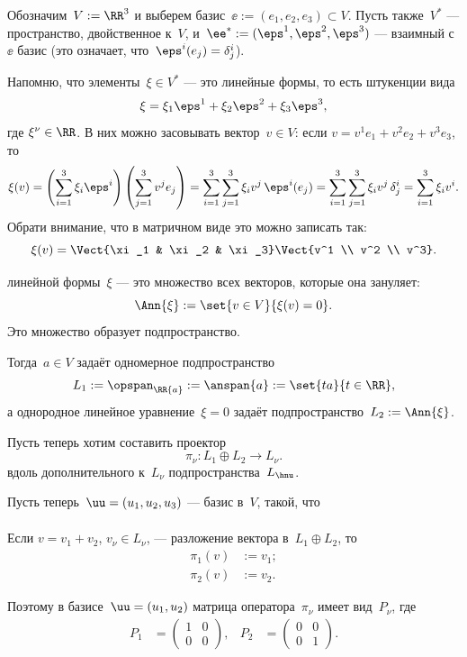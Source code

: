 \begin{proofm}
	Обозначим~$V := \RR^3$ и выберем базис~$\ee := (e_1, e_2, e_3) \subset V$. Пусть также~$V^*$ --- пространство, двойственное к~$V$, и~$\ee^* := (\eps^1, \eps^2, \eps^3)$ --- взаимный с~$\ee$ базис (это означает, что~$\eps^i(e_j) = \delta^i_j$).

	Напомню, что элементы~$\xi \in V^*$ --- это линейные формы, то есть штукенции вида
	\[
		\xi = \xi_1 \eps^1 + \xi_2 \eps^2 + \xi_3 \eps^3
		,
	\]
	где $\xi^\nu \in \RR$. В них можно засовывать вектор~$v \in V$: если $v = v^1 e_1 + v^2 e_2 + v^3 e_3$, то
	\[
		\xi(v) =
		\left( 
			\sum_{i = 1}^3
				\xi_i \eps^i
		\right)
		\left( 
			\sum_{j = 1}^3
				v^j e_j
		\right)
		=
		\sum_{i = 1}^3
		\sum_{j = 1}^3
			\xi_i v^j\,\eps^i(e_j)
		=
		\sum_{i = 1}^3
		\sum_{j = 1}^3
			\xi_i v^j\,\delta^i_j
		=
		\sum_{i = 1}^3
			\xi_i v^i
		.
	\]
	Обрати внимание, что в матричном виде это можно записать так:
	\[
		\xi(v) =
		\Vect{\xi_1 & \xi_2 & \xi_3}
		\Vect{v^1 \\ v^2 \\ v^3}
		.
	\]

	\begin{definition}
		 линейной формы~$\xi$ --- это множество всех векторов, которые она зануляет:
		\[
			\Ann{\xi} :=
			\set{v \in V}{\xi(v) = 0}
			.
		\]
		Это множество образует подпространство.
	\end{definition}

	Тогда~$a \in V$ задаёт одномерное подпространство
	\[
		L_1 :=
		\opspan_\RR{a} :=
		\anspan{a} :=
		\set{ta}{t \in \RR},
	\]
	а однородное линейное уравнение~$\xi = 0$ задаёт подпространство~$L_2 := \Ann{\xi}$.

	Пусть теперь хотим составить проектор
	\[
		\pi_\nu \colon L_1 \oplus L_2 \to L_\nu
		.
	\]
	вдоль дополнительного к~$L_\nu$ подпространства~$L_{\hnu}$.
	
	Пусть теперь~$\uu = (u_1, u_2, u_3)$ --- базис в~$V$, такой, что
	\begin{align*}
	\end{align*}

	Если $v = v_1 + v_2$, $v_\nu \in L_\nu$, --- разложение вектора в~$L_1 \oplus L_2$, то
	\begin{align*}
		\pi_1(v) &:= v_1;
		\\
		\pi_2(v) &:= v_2.
	\end{align*}

	Поэтому в базисе~$\uu = (u_1, u_2)$ матрица оператора~$\pi_\nu$ имеет вид~$P_\nu$, где
	\begin{align*}
		P_1 &=
		\begin{pmatrix}
			1 & 0
			\\
			0 & 0
		\end{pmatrix}
		,
		&
		P_2 &=
		\begin{pmatrix}
			0 & 0
			\\
			0 & 1
		\end{pmatrix}
		.
	\end{align*}
	




\end{proofm}
